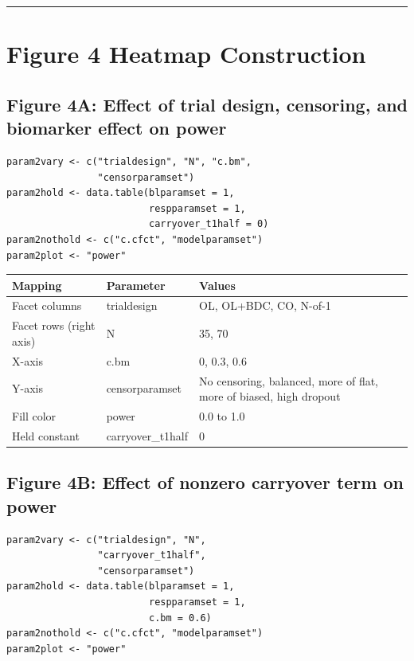 \documentclass[11pt]{article}
\begin{document}
\bigskip\noindent\rule{\textwidth}{0.4pt}\bigskip

\section{Figure 4 Heatmap Construction}

\subsection{Figure 4A: Effect of trial design, censoring, and
biomarker effect on power}

\begin{lstlisting}
param2vary <- c("trialdesign", "N", "c.bm",
                "censorparamset")
param2hold <- data.table(blparamset = 1,
                         respparamset = 1,
                         carryover_t1half = 0)
param2nothold <- c("c.cfct", "modelparamset")
param2plot <- "power"
\end{lstlisting}

\begin{table}[h]
\centering
\begin{tabular}{lll}
\toprule
Mapping & Parameter & Values \\
\midrule
Facet columns & trialdesign & OL, OL+BDC, CO, N-of-1 \\
Facet rows (right axis) & N & 35, 70 \\
X-axis & c.bm & 0, 0.3, 0.6 \\
Y-axis & censorparamset & No censoring, balanced, more of flat, more of biased, high dropout \\
Fill color & power & 0.0 to 1.0 \\
Held constant & carryover\_t1half & 0 \\
\bottomrule
\end{tabular}
\end{table}

\subsection{Figure 4B: Effect of nonzero carryover term on power}

\begin{lstlisting}
param2vary <- c("trialdesign", "N",
                "carryover_t1half",
                "censorparamset")
param2hold <- data.table(blparamset = 1,
                         respparamset = 1,
                         c.bm = 0.6)
param2nothold <- c("c.cfct", "modelparamset")
param2plot <- "power"
\end{lstlisting}
\end{document}
